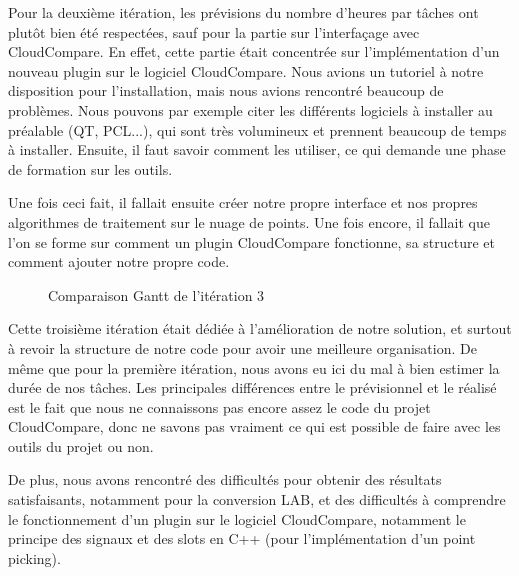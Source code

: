 \documentclass[12pt,titlepage,french]{article}
\begin{document}
Pour la deuxième itération, les prévisions du nombre d'heures par tâches ont plutôt bien été respectées, sauf pour la partie sur l'interfaçage avec CloudCompare. En effet, cette partie était concentrée sur l'implémentation d'un nouveau plugin sur le logiciel CloudCompare. Nous avions un tutoriel à notre disposition pour l'installation, mais nous avions rencontré beaucoup de problèmes. Nous pouvons par exemple citer les différents logiciels à installer au préalable (QT, PCL...), qui sont très volumineux et prennent beaucoup de temps à installer. Ensuite, il faut savoir comment les utiliser, ce qui demande une phase de formation sur les outils. \newline

Une fois ceci fait, il fallait ensuite créer notre propre interface et nos propres algorithmes de traitement sur le nuage de points. Une fois encore, il fallait que l'on se forme sur comment un plugin CloudCompare fonctionne, sa structure et comment ajouter notre propre code.

\begin{figure}[H]
    \caption{\label{} Comparaison Gantt de l'itération 3}
\end{figure}

Cette troisième itération était dédiée à l'amélioration de notre solution, et surtout à revoir la structure de notre code pour avoir une meilleure organisation. De même que pour la première itération, nous avons eu ici du mal à bien estimer la durée de nos tâches. Les principales différences entre le prévisionnel et le réalisé est le fait que nous ne connaissons pas encore assez le code du projet CloudCompare, donc ne savons pas vraiment ce qui est possible de faire avec les outils du projet ou non. \newline

De plus, nous avons rencontré des difficultés pour obtenir des résultats satisfaisants, notamment pour la conversion LAB, et des difficultés à comprendre le fonctionnement d'un plugin sur le logiciel CloudCompare, notamment le principe des signaux et des slots en C++ (pour l'implémentation d'un point picking). \newline
\end{document}
